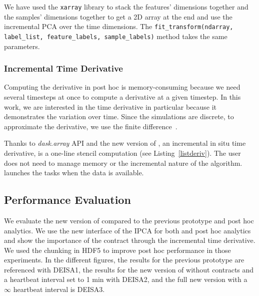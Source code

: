 We have used the \texttt{xarray} library to stack the features' dimensions together and the samples' dimensions together to get a 2D array at the end and use the incremental PCA over the time dimensions. The \texttt{fit\_transform(ndarray, label\_list, feature\_labels, sample\_labels)} method takes the same parameters.

\subsubsection{Incremental Time Derivative}

Computing the derivative in post hoc is memory-consuming because we need several timesteps at once to compute a derivative at a given timestep.
In this work, we are interested in the time derivative in particular because it demonstrates the variation over time. Since the simulations are discrete, to approximate the derivative, we use the finite difference~\cite{fornberg_generation_1988}. 

Thanks to \textit{dask.array} API and the new version of \deisa, an incremental in situ time derivative, is a one-line stencil computation (see Listing~\ref{listderiv}). The user does not need to manage memory or the incremental nature of the algorithm. \dask launches the tasks when the data is available. 

\subsection{Performance Evaluation}
We evaluate the new version of \deisa compared to the previous prototype and post hoc analytics. We use the new interface of the IPCA for both \deisa and post hoc analytics and show the importance of the contract through the incremental time derivative.
We used the chunking in HDF5 to improve post hoc performance in those experiments.
In the different figures, the results for the previous \deisa prototype are referenced with DEISA1, 
the results for the new version of \deisa without contracts and a heartbeat interval set to 1 min with DEISA2, 
and the full new version with a $\infty$ heartbeat interval is DEISA3.

